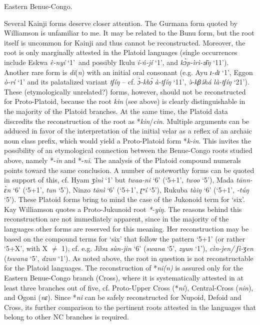 Eastern Benue-Congo.

Several Kainji forms deserve closer attention. The Gurmana form quoted by Williamson is unfamiliar to me. It may be related to the Bunu form, but the root itself is uncommon for Kainji and thus cannot be reconstructed. Moreover, the root is only marginally attested in the Platoid languages (single occurrences include Eskwa \textit{è-nyí} ‘1’~and possibly Ikulu \textit{í-ń-jí} ‘1’, and \textit{k{\`{ɔ}}p-ìrì-z{\={ɨ}}ŋ} ‘11’). Another rare form is \textit{di}(\textit{n}) with an initial oral consonant (e.g. Ayu \textit{ɪ-dɪ} ‘1’, Eggon \textit{ò-rí} ‘1’ and its palatalized variant \textit{tʃíŋ} – cf. \textit{{\`{ɔ}}-kb{\'{ɔ}}} \textit{à-tʃíŋ} ‘11’, \textit{{\`{ə}}-kβ}\textit{{\'{ə}}há} \textit{là-tʃíŋ} ‘21’). These (etymologically unrelated?) forms, however, should not be reconstructed for Proto-Platoid, because the root \textit{kin} (see above) is clearly distinguishable in the majority of the Platoid branches. At the same time, the Platoid data discredits the reconstruction of the root as *\textit{kin}/\textit{cin}. Multiple arguments can be adduced in favor of the interpretation of the initial velar as a reflex of an archaic noun class prefix, which would yield a Proto-Platoid form *\textit{k-in}. This invites the possibility of an etymological connection between the Benue-Congo roots studied above, namely *-\textit{in} and *-\textit{ni}. The analysis of the Platoid compound numerals points toward the same conclusion. A number of noteworthy forms can be quoted in support of this, cf.  Hyam \textit{ʒìnì} ‘1’ but \textit{twaa-ni} ‘6’ (‘5+1’, \textit{twoo} ‘5’), Mada \textit{t{\={a}}nn-{\`{ɛ}}n} ‘6’ (‘5+1’, \textit{tun} ‘5’), Ninzo \textit{t{\={a}}nì} ‘6’ (‘5+1’, \textit{ʈʷí} ‘5’), Rukuba \textit{tàiŋ} ‘6’ (‘5+1’, \textit{-t{\'{u}}ŋ} ‘5’). These Platoid forms bring to mind the case of the Jukonoid term for ‘six’. Kay Williamson quotes a Proto-Jukunoid root \textit{*-yiŋ.} The reasons behind this reconstruction are not immediately apparent, since in the majority of the languages other forms are reserved for this meaning. Her reconstruction may be based on the compound terms for ‘six’ that follow the pattern ‘5+1’ (or rather ‘5+X’, with X ${\neq}$ 1), cf. e.g. Jibu \textit{s{\`{u}}n-jin} ‘6’ (\textit{swana} ‘5’, \textit{zyun} ‘1’), \textit{cìn-jen/} \textit{ʃì-ʒen} (\textit{tswana} ‘5’, \textit{dzun} ‘1’). As noted above, the root in question is not reconstructable for the Platoid languages. The reconstruction of *\textit{ni(n)} is assured only for the Eastern Benue-Congo branch (Cross), where it is systematically attested in at least three branches out of five, cf. Proto-Upper Cross (*\textit{ni}), Central-Cross (\textit{nin}), and Ogoni (\textit{nɛ}). Since *\textit{ni} can be safely reconstructed for Nupoid, Defoid and Cross, its further comparison to the pertinent roots attested in the languages that belong to other NC branches is required.

